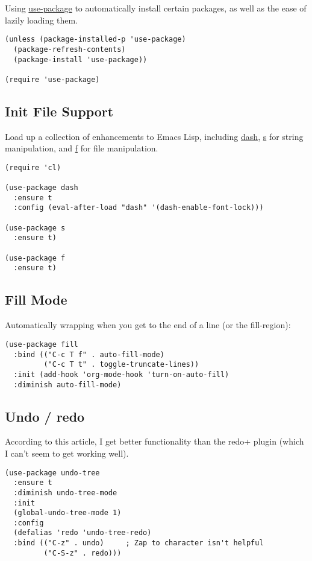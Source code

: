 \documentclass[12pt]{article}
\begin{document}
Using \href{https://github.com/jwiegley/use-package}{use-package} to automatically install certain packages, as
well as the ease of lazily loading them.

\lstset{language=Lisp,label= ,caption= ,numbers=none}
\begin{lstlisting}
(unless (package-installed-p 'use-package)
  (package-refresh-contents)
  (package-install 'use-package))

(require 'use-package)
\end{lstlisting}

\subsection{Init File Support}
\label{sec-2-3}

Load up a collection of enhancements to Emacs Lisp, including \href{https://github.com/magnars/dash.el}{dash},
\href{https://github.com/magnars/s.el}{s} for string manipulation, and \href{https://github.com/rejeep/f.el}{f} for file manipulation.

\lstset{language=Lisp,label= ,caption= ,numbers=none}
\begin{lstlisting}
(require 'cl)

(use-package dash
  :ensure t
  :config (eval-after-load "dash" '(dash-enable-font-lock)))

(use-package s
  :ensure t)

(use-package f
  :ensure t)
\end{lstlisting}

\subsection{Fill Mode}
\label{sec-2-4}
Automatically wrapping when you get to the end of a line (or the fill-region):

\lstset{language=Lisp,label= ,caption= ,numbers=none}
\begin{lstlisting}
(use-package fill
  :bind (("C-c T f" . auto-fill-mode)
         ("C-c T t" . toggle-truncate-lines))
  :init (add-hook 'org-mode-hook 'turn-on-auto-fill)
  :diminish auto-fill-mode)
\end{lstlisting}

\subsection{Undo / redo}
\label{sec-2-5}
According to this article, I get better functionality than the redo+ plugin (which I can’t seem to get working well).
\lstset{language=Lisp,label= ,caption= ,numbers=none}
\begin{lstlisting}
(use-package undo-tree
  :ensure t
  :diminish undo-tree-mode
  :init
  (global-undo-tree-mode 1)
  :config
  (defalias 'redo 'undo-tree-redo)
  :bind (("C-z" . undo)     ; Zap to character isn't helpful
         ("C-S-z" . redo)))
\end{lstlisting}
\end{document}
